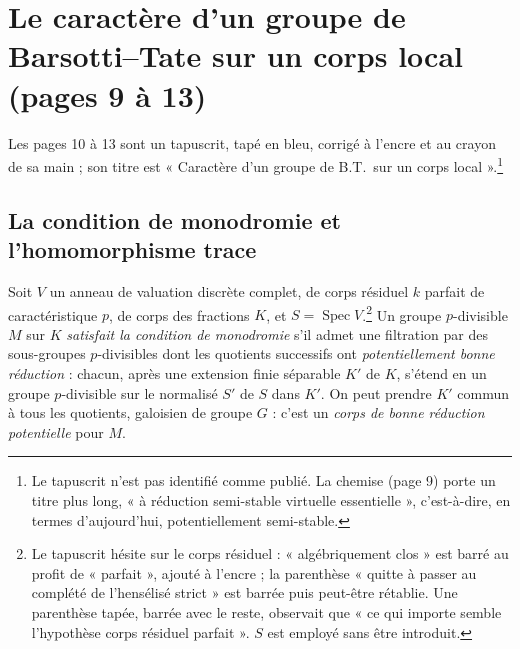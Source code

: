 \documentclass[11pt,a4paper]{article}
\begin{document}
\section*{Le caractère d'un groupe de Barsotti--Tate sur un corps local (pages 9 à 13)}

Les pages 10 à 13 sont un tapuscrit, tapé en bleu, corrigé à l'encre et au
crayon de sa main ; son titre est « Caractère d'un groupe de B.T.\ sur un
corps local ».\footnote{Le tapuscrit n'est pas identifié comme publié. La
chemise (page 9) porte un titre plus long, « à réduction semi-stable
virtuelle essentielle », c'est-à-dire, en termes d'aujourd'hui,
potentiellement semi-stable.}

\subsection*{La condition de monodromie et l'homomorphisme trace}

Soit $V$ un anneau de valuation discrète complet, de corps résiduel $k$
parfait de caractéristique $p$, de corps des fractions $K$, et $S =
\operatorname{Spec} V$.\footnote{Le tapuscrit hésite sur le corps
résiduel : « algébriquement clos » est barré au profit de « parfait », ajouté
à l'encre ; la parenthèse « quitte à passer au complété de l'hensélisé
strict » est barrée puis peut-être rétablie. Une parenthèse tapée, barrée
avec le reste, observait que « ce qui importe semble l'hypothèse corps
résiduel parfait ». $S$ est employé sans être
introduit.} Un groupe $p$-divisible $M$ sur $K$ \emph{satisfait la condition
de monodromie} s'il admet une filtration par des sous-groupes $p$-divisibles
dont les quotients successifs ont \emph{potentiellement bonne réduction} :
chacun, après une extension finie séparable $K'$ de $K$, s'étend en un
groupe $p$-divisible sur le normalisé $S'$ de $S$ dans $K'$. On peut prendre
$K'$ commun à tous les quotients, galoisien de groupe $G$ : c'est un
\emph{corps de bonne réduction potentielle} pour $M$.
\end{document}
